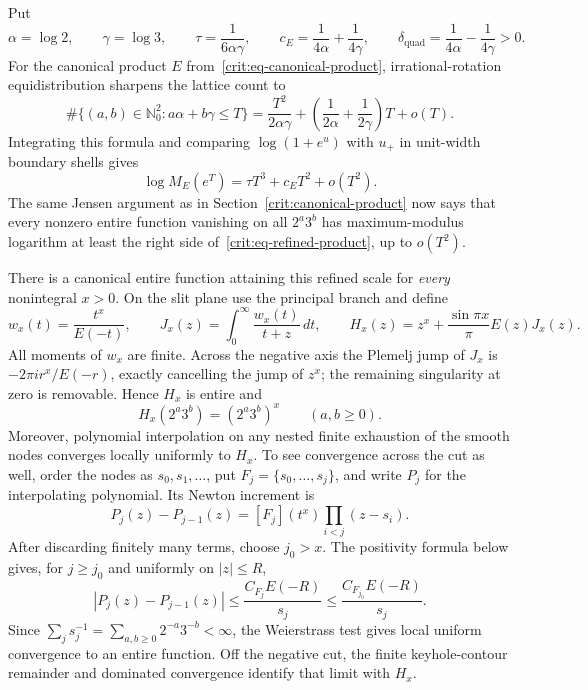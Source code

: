 \documentclass[11pt,oneside]{article}
\theoremstyle{definition}
\theoremstyle{remark}
\newcommand{\Nzero}{\mathbb N_0}
\begin{document}
Put
\[
 \alpha=\log2,\qquad \gamma=\log3,\qquad
 \tau=\frac1{6\alpha\gamma},\qquad
 c_E=\frac1{4\alpha}+\frac1{4\gamma},\qquad
 \delta_{\mathrm{quad}}=\frac1{4\alpha}-\frac1{4\gamma}>0.
\]
For the canonical product $E$ from~\eqref{crit:eq-canonical-product}, irrational-rotation
equidistribution sharpens the lattice count to
\begin{equation}
 \#\{(a,b)\in\Nzero^2:a\alpha+b\gamma\le T\}
 =\frac{T^2}{2\alpha\gamma}
  +\left(\frac1{2\alpha}+\frac1{2\gamma}\right)T+o(T).
 \label{crit:eq-refined-count}
\end{equation}
Integrating this formula and comparing
$\log(1+e^u)$ with $u_+$ in unit-width boundary shells gives
\begin{equation}
 \boxed{\log M_E(e^T)=\tau T^3+c_ET^2+o(T^2).}
 \label{crit:eq-refined-product}
\end{equation}
The same Jensen argument as in Section~\ref{crit:canonical-product} now says that every
nonzero entire function vanishing on all $2^a3^b$ has maximum-modulus logarithm at least the
right side of~\eqref{crit:eq-refined-product}, up to $o(T^2)$.

There is a canonical entire function attaining this refined scale for \emph{every}
nonintegral $x>0$.  On the slit plane use the principal branch and define
\begin{equation}
 w_x(t)=\frac{t^x}{E(-t)},\qquad
 J_x(z)=\int_0^\infty\frac{w_x(t)}{t+z}\,dt,\qquad
 H_x(z)=z^x+\frac{\sin\pi x}{\pi}E(z)J_x(z).
 \label{crit:eq-stieltjes-interpolant}
\end{equation}
All moments of $w_x$ are finite.  Across the negative axis the Plemelj jump of $J_x$ is
$-2\pi i r^x/E(-r)$, exactly cancelling the jump of $z^x$; the remaining singularity at
zero is removable.  Hence $H_x$ is entire and
\begin{equation}
 H_x(2^a3^b)=(2^a3^b)^x\qquad(a,b\ge0).
 \label{crit:eq-exact-interpolation}
\end{equation}
Moreover, polynomial interpolation on any nested finite exhaustion of the smooth nodes
converges locally uniformly to $H_x$.  To see convergence across the cut as well, order the
nodes as $s_0,s_1,\ldots$, put $F_j=\{s_0,\ldots,s_j\}$, and write $P_j$ for the
interpolating polynomial.  Its Newton increment is
\[
 P_j(z)-P_{j-1}(z)=[F_j](t^x)\prod_{i<j}(z-s_i).
\]
After discarding finitely many terms, choose $j_0>x$.  The positivity formula below gives,
for $j\ge j_0$ and uniformly on $|z|\le R$,
\[
 |P_j(z)-P_{j-1}(z)|
 \le \frac{C_{F_j}E(-R)}{s_j}
 \le \frac{C_{F_{j_0}}E(-R)}{s_j}.
\]
Since $\sum_j s_j^{-1}=\sum_{a,b\ge0}2^{-a}3^{-b}<\infty$, the Weierstrass test gives
local uniform convergence to an entire function.  Off the negative cut, the finite
keyhole-contour remainder and dominated convergence identify that limit with $H_x$.
\end{document}
